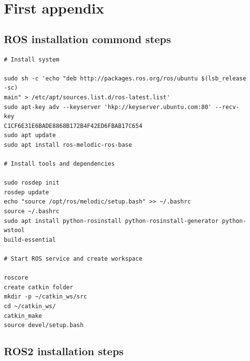 \documentclass{mproj}
\begin{document}



\appendix %
\chapter{First appendix}

\section{ROS installation commond steps}

\begin{verbatim}
# Install system

sudo sh -c 'echo "deb http://packages.ros.org/ros/ubuntu $(lsb_release -sc)
main" > /etc/apt/sources.list.d/ros-latest.list'
sudo apt-key adv --keyserver 'hkp://keyserver.ubuntu.com:80' --recv-key
C1CF6E31E6BADE8868B172B4F42ED6FBAB17C654
sudo apt update
sudo apt install ros-melodic-ros-base

# Install tools and dependencies

sudo rosdep init
rosdep update
echo "source /opt/ros/melodic/setup.bash" >> ~/.bashrc
source ~/.bashrc
sudo apt install python-rosinstall python-rosinstall-generator python-wstool 
build-essential

# Start ROS service and create workspace

roscore
create catkin folder
mkdir -p ~/catkin_ws/src
cd ~/catkin_ws/
catkin_make
source devel/setup.bash

\end{verbatim}

\section{ROS2 installation steps}
\end{document}
